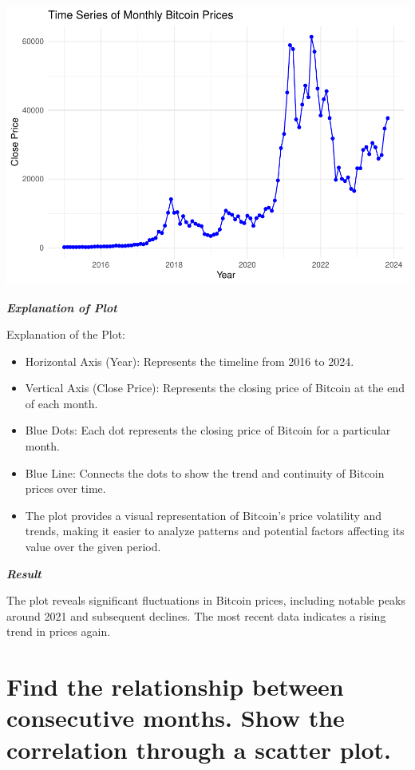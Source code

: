 \documentclass[
]{book}
\providecommand{\tightlist}{%
  \setlength{\itemsep}{0pt}\setlength{\parskip}{0pt}}
\begin{document}
\includegraphics{bookdown-demo_files/figure-latex/unnamed-chunk-13-1.pdf}

\emph{\textbf{Explanation of Plot}}

Explanation of the Plot:

\begin{itemize}
\tightlist
\item
  Horizontal Axis (Year): Represents the timeline from 2016 to 2024.
\item
  Vertical Axis (Close Price): Represents the closing price of Bitcoin at the end of each month.
\item
  Blue Dots: Each dot represents the closing price of Bitcoin for a particular month.
\item
  Blue Line: Connects the dots to show the trend and continuity of Bitcoin prices over time.
\item
  The plot provides a visual representation of Bitcoin's price volatility and trends, making it easier to analyze patterns and potential factors affecting its value over the given period.
\end{itemize}

\emph{\textbf{Result}}

The plot reveals significant fluctuations in Bitcoin prices, including notable peaks around 2021 and subsequent declines. The most recent data indicates a rising trend in prices again.

\section*{Find the relationship between consecutive months. Show the correlation through a scatter plot.}\label{find-the-relationship-between-consecutive-months.-show-the-correlation-through-a-scatter-plot.}
\end{document}
